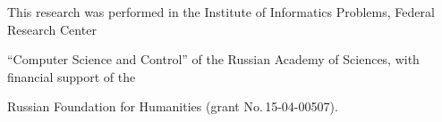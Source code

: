 







\vspace*{-12pt}



\Ack

\noindent

This research was performed in the Institute of Informatics Problems, Federal Research Center 

``Computer Science and Control'' of the Russian Academy of Sciences, with financial support of the 

Russian Foundation for Humanities (grant No.\,15-04-00507).





\vspace*{6pt}



